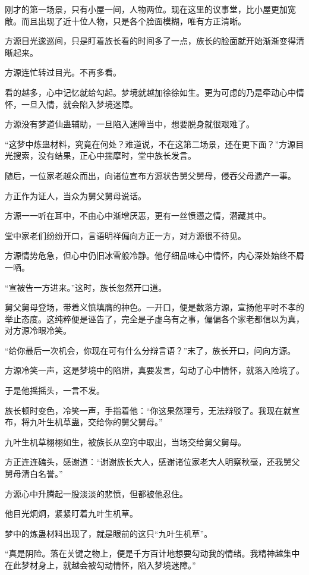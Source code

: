 \begin{this_body}
刚才的第一场景，只有小屋一间，人物两位。现在这里的议事堂，比小屋更加宽敞。而且出现了近十位人物，只是各个脸面模糊，唯有方正清晰。

方源目光逡巡间，只是盯着族长看的时间多了一点，族长的脸面就开始渐渐变得清晰起来。

方源连忙转过目光。不再多看。

看的越多，心中记忆就给勾起。梦境就越加徐徐如生。更为可虑的乃是牵动心中情怀，一旦入情，就会陷入梦境迷障。

方源没有梦道仙蛊辅助，一旦陷入迷障当中，想要脱身就很艰难了。

“这梦中炼蛊材料，究竟在何处？难道说，不在这第二场景，还在更下面？”方源目光搜索，没有结果，正心中揣摩时，堂中族长发言。

随后，一位家老越众而出，向诸位宣布方源状告舅父舅母，侵吞父母遗产一事。

方正作为证人，当众为舅父舅母说话。

方源一一听在耳中，不由心中渐增厌恶，更有一丝愤懑之情，潜藏其中。

堂中家老们纷纷开口，言语明祥偏向方正一方，对方源很不待见。

方源情势危急，但心中仍旧冰雪般冷静。他仔细品味心中情怀，内心深处始终不屑一哂。

“宣被告一方进来。”这时，族长忽然开口道。

舅父舅母登场，带着义愤填膺的神色。一开口，便是数落方源，宣扬他平时不孝的举止态度。这纯粹便是诬告了，完全是子虚乌有之事，偏偏各个家老都信以为真，对方源冷眼冷笑。

“给你最后一次机会，你现在可有什么分辩言语？”末了，族长开口，问向方源。

方源冷笑一声，这是梦境中的陷阱，真要发言，勾动了心中情怀，就落入险境了。

于是他摇摇头，一言不发。

族长顿时变色，冷笑一声，手指着他：“你这果然理亏，无法辩驳了。我现在就宣布，将九叶生机草蛊，交给你的舅父舅母。”

九叶生机草栩栩如生，被族长从空窍中取出，当场交给舅父舅母。

方正连连磕头，感谢道：“谢谢族长大人，感谢诸位家老大人明察秋毫，还我舅父舅母清白名誉。”

方源心中升腾起一股淡淡的悲愤，但都被他忍住。

他目光炯炯，紧紧盯着九叶生机草。

梦中的炼蛊材料出现了，就是眼前的这只“九叶生机草”。

“真是阴险。落在关键之物上，便是千方百计地想要勾动我的情绪。我精神越集中在此梦材身上，就越会被勾动情怀，陷入梦境迷障。”


\end{this_body}
